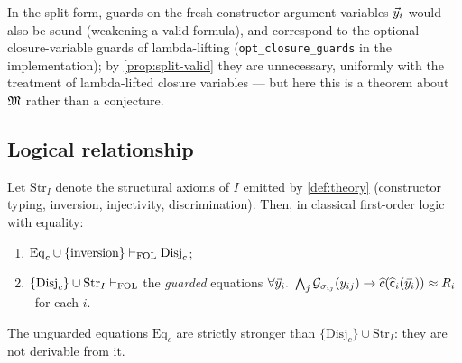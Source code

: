\begin{remark}
\label{rem:guard-policy}
In the split form, guards on the fresh constructor-argument variables
$\vec{y}_i$ would also be sound (weakening a valid formula), and
correspond to the optional closure-variable guards of lambda-lifting
(\texttt{opt\_closure\_guards} in the implementation); by
\cref{prop:split-valid} they are unnecessary, uniformly with the
treatment of lambda-lifted closure variables --- but here this is a
theorem about $\mathfrak{M}$ rather than a conjecture.
\end{remark}

\subsection{Logical relationship}
\label{sec:casesplit-derive}

\begin{proposition}
\label{prop:interderivable}
Let $\mathrm{Str}_I$ denote the structural axioms of $I$ emitted by
\cref{def:theory} (constructor typing, inversion, injectivity,
discrimination).  Then, in classical first-order logic with equality:
\begin{enumerate}[leftmargin=2em]
\item $\mathrm{Eq}_c \cup \{\text{inversion}\} \vdash_{\mathrm{FOL}}
  \mathrm{Disj}_c$;
\item $\{\mathrm{Disj}_c\} \cup \mathrm{Str}_I \vdash_{\mathrm{FOL}}$ the
  \emph{guarded} equations
  $\forall \vec{y}_i.\ \bigwedge_j \mathcal{G}_{\sigma_{ij}}(y_{ij}) \to
  \widehat{c}(\widehat{\mathsf{c}}_i(\vec{y}_i)) \approx R_i$ \ for each $i$.
\end{enumerate}
The unguarded equations $\mathrm{Eq}_c$ are strictly stronger than
$\{\mathrm{Disj}_c\} \cup \mathrm{Str}_I$: they are not derivable from
it.
\end{proposition}

